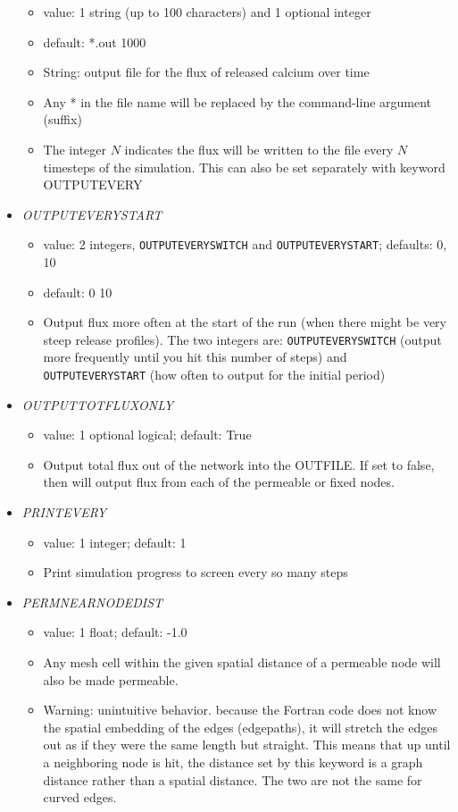 \documentclass[12pt]{article}
\begin{document}
\begin{itemize}
\begin{itemize}
      \item  value: 1 string (up to 100 characters) and 1 optional integer
      \item  default: *.out 1000
      \item String: output file for the flux of released calcium over time      
      \item Any * in the file name will be replaced by the command-line argument (suffix)
      \item The integer $N$ indicates the flux will be written to the file every $N$ timesteps of the simulation. This can also be set separately with keyword OUTPUTEVERY
      \end{itemize}
%
\item {\it OUTPUTEVERYSTART}
\begin{itemize}
	\item  value: 2 integers, \verb=OUTPUTEVERYSWITCH= and \verb=OUTPUTEVERYSTART=; defaults: 0, 10
	\item  default: 0 10
	\item Output flux more often at the start of the run (when there might be very steep release profiles). The two integers are: \verb=OUTPUTEVERYSWITCH= (output more frequently until you hit this number of steps) and \verb=OUTPUTEVERYSTART= (how often to output for the initial period)
\end{itemize}
%
\item {\it OUTPUTTOTFLUXONLY}
\begin{itemize}
	\item  value: 1 optional logical; default: True
	\item Output total flux out of the network into the OUTFILE. If set to false, then will output flux from each of the permeable or fixed nodes.
\end{itemize}
%
\item {\it PRINTEVERY}
\begin{itemize}
	\item  value: 1 integer; default: 1
	\item Print simulation progress to screen every so many steps
\end{itemize}
%
\item {\it PERMNEARNODEDIST}
\begin{itemize}
	\item  value: 1 float; default: -1.0
	\item Any mesh cell within the given spatial distance of a permeable node will also be made permeable.
	\item {\color{red} Warning: unintuitive behavior.} because the Fortran code does not know the spatial embedding of the edges (edgepaths), it will stretch the edges out as if they were the same length but straight. This means that up until a neighboring node is hit, the distance set by this keyword is a graph distance rather than a spatial distance. The two are not the same for curved edges.

\end{itemize}
\end{itemize}
\end{document}
